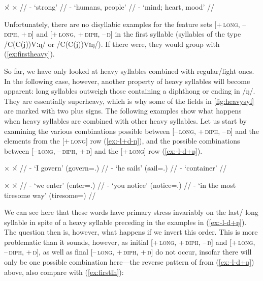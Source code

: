 \a\label{ex:firstheavy}\begingl
	\gla ×́		{}	×		{} //
	\glb {}	-			{`strong'} //
	\glb {}	-		{`humans, people'} //
	\glb {}	-			{`mind; heart, mood'} //
\endgl
\xe

Unfortunately, there are no disyllabic examples for the feature sets 
\textsc{[+\,long, \mbox{–\,diph,} +\,ŋ]} and \textsc{[+\,long, +\,diph, –\,ŋ]} 
in the first syllable (syllables of the type /C(C(j))Vːŋ/ or /C(C(j))Vɪŋ/). 
If there were, they would group with (\ref{ex:firstheavy}).

So far, we have only looked at heavy syllables combined with regular/light ones. 
In the following case, however, another property of heavy syllables will become 
apparent: long syllables outweigh those containing a diphthong or ending in /ŋ/. 
They are essentially superheavy, which is why some 
of the fields in \autoref{fig:heavysyl} are marked with two plus signs. The 
following examples show what happens when heavy syllables are combined with 
other heavy syllables. Let us start by examining the various combinations 
possible between \textsc{[–\,long, +\,diph, –\,ŋ]} and the elements from the 
\textsc{[+\,long]} row (\ref{ex:-l+d-ŋ}), and the possible combinations between 
\textsc{[–\,long, \mbox{–\,diph,} +\,ŋ]} and the \textsc{[+\,long]} row 
(\ref{ex:-l-d+ŋ}).

\pex[everygla=\upshape]\label{ex:lastheavy}
\a\label{ex:-l+d-ŋ}\begingl
	\gla ×		{}	×́		{} //
	\glb {}	-		{`I govern' 
		(govern=\Fsg{}.\Top{})} //
	\glb {}	-		{`he sails' 
		(sail=\TsgM{}.\Aarg{})} //
	\glb {}	-		{`container'} //
\endgl

\a\label{ex:-l-d+ŋ}\begingl
	\gla ×		{}	×́		{} //
	\glb {}	-		{`we enter' 
		(enter=\Fpl{}.\Top{})} //
	\glb {}	-		{`you notice' 
		(notice=\Ssg{}.\Aarg{})} //
	\glb {}	-		{`in the most tiresome way' 
		(tiresome=\Supl{})} //
\endgl
\xe

We can see here that these words have primary stress invariably on the last/%
long syllable in spite of a heavy syllable preceding in the 
examples in (\ref{ex:-l-d+ŋ}). The question then is, however, what happens if 
we invert this order. This is more problematic than it sounds, however, as 
initial 
\textsc{[+\,long, +\,diph, –\,ŋ]} and \textsc{[+\,long, –\,diph, +\,ŋ]}, as 
well as final \textsc{[–\,long, +\,diph, +\,ŋ]} do not occur, insofar there 
will only be one possible combination here---the reverse pattern of 
 from (\ref{ex:-l-d+ŋ}) above, 
also compare with (\ref{ex:firstlh}):

